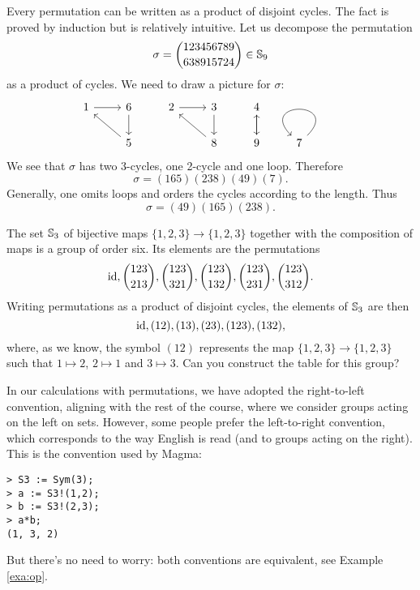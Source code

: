 Every permutation can be written as a product of disjoint cycles. The fact 
is proved by induction but is relatively intuitive. Let us 
decompose the permutation 
\[
\sigma=\binom{123456789}{638915724}\in\mathbb{S}_{9}
\]
as a product of cycles. We need to 
draw a picture for $\sigma$:
\[\begin{tikzcd}
	1 & 6 & 2 & 3 & 4 & \\
	& 5 && 8 & 9 & 7\arrow[loop]        
	\arrow[from=1-1, to=1-2]
	\arrow[from=1-2, to=2-2]
	\arrow[from=2-2, to=1-1]
	\arrow[from=1-3, to=1-4]
	\arrow[from=1-4, to=2-4]
	\arrow[from=2-4, to=1-3]
	\arrow[from=1-5, to=2-5]
	\arrow[from=2-5, to=1-5]
\end{tikzcd}\]
We see that $\sigma$ has two 3-cycles, one 2-cycle
and one loop. 
Therefore 
\[
\sigma=(165)(238)(49)(7).
\]
Generally, 
one omits loops and orders  
the cycles according to 
the length. Thus 
\[
\sigma=(49)(165)(238).
\]

\begin{example}
\label{exa:S3}
The set $\mathbb{S}_3$ of bijective maps $\{1,2,3\}\to\{1,2,3\}$
together with the composition of maps is a group of order six. 
Its elements are the permutations 
        \[
        \operatorname{id},\binom{123}{213},\binom{123}{321},\binom{123}{132},\binom{123}{231},
\binom{123}{312}.
        \]
        Writing 
        permutations as a product of disjoint cycles,  
        the elements of $\mathbb{S}_3$ 
        are then         
        \[
                \operatorname{id},(12),(13),(23),(123),(132),
        \]
        where, as we know, the symbol $(12)$ represents 
        the map $\{1,2,3\}\to\{1,2,3\}$ such that 
        $1\mapsto 2$, $2\mapsto 1$ and $3\mapsto 3$. 
        Can you construct the table for this group? 
\end{example}

\label{convention:left-to-right}
In our calculations with permutations, we have adopted the right-to-left convention, aligning with the rest of the course, where we consider groups acting on the left on sets. However, some people prefer the left-to-right convention, which corresponds to the way English is read (and to groups acting on the right). This is the convention used by Magma:
\begin{lstlisting}
> S3 := Sym(3);
> a := S3!(1,2);
> b := S3!(2,3);
> a*b;
(1, 3, 2)
\end{lstlisting}
But there’s no need to worry: both conventions are equivalent, see Example \ref{exa:op}. 

